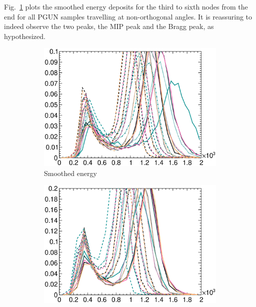 	Fig.~\ref{subfig:esc-smooth-e} plots the smoothed energy deposits for the third to sixth nodes from the end for all PGUN samples travelling at non-orthogonal angles.
	It is reassuring to indeed observe the two peaks, the MIP peak and the Bragg peak, as hypothesized. 
     \begin{figure}[htb]
        \centering
        \begin{subfigure}{\dbfigwid\textwidth}
             \centering
             \includegraphics[width=\textwidth]{figures/sel/dedx5_pdf_skew_smooth.eps}
             \caption{Smoothed energy}
             \label{subfig:esc-smooth-e}
        \end{subfigure}
        \begin{subfigure}{\dbfigwid\textwidth}
             \centering
             \includegraphics[width=\textwidth]{figures/sel/an_dedx5_pdf_skew_smooth_angnorm.eps}

\end{subfigure}
\end{figure}
